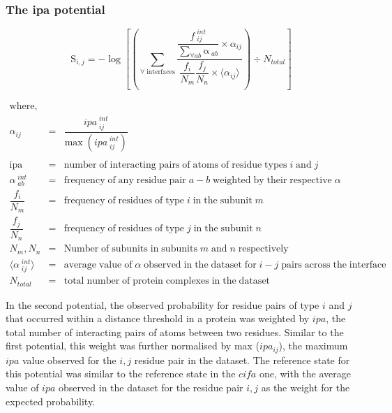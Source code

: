 \vspace{24pt}

\subsubsection{The ipa potential}

\vspace{24pt}

\begingroup
\large
\begin{equation}
\mathrm{S}_{i,j} = -\log \left[ \left( \sum\limits_{\forall \; \mathrm{interfaces}} \dfrac {\dfrac{ f_{\;ij}^{\;int}}{\sum\limits_{\forall ab} \mathrm{\alpha}_{\;ab}} \times \alpha_{ij}} {\dfrac{f_i}{N_m} \dfrac{f_j}{N_n} \times \langle \alpha_{ij} \rangle} \right) \div N_{total} \right]
\end{equation}
\endgroup

\begingroup
\setlength\abovedisplayskip{0pt}
\begin{eqnarray}
\mathrm{where,} \nonumber \\
\alpha_{ij} &=& \dfrac{{ipa}_{\;ij}^{\; int}}{\mathrm{max} \; ({ipa}_{\;ij}^{\;int})} \nonumber \\
\nonumber \\
\mathrm{ipa} &=&  \mathrm{number\; of \;interacting\; pairs\; of\; atoms \; of\;residue\; types\;} i \;\mathrm{and} \; j
\nonumber \\
\alpha_{\;ab}^{\;int} &=& \mathrm{frequency\;of\;any\;residue\;pair}\;a-b\; \mathrm{weighted\;by\;their\;respective\;}\alpha
\nonumber \\
\dfrac{f_i}{N_m} &=& \mathrm{frequency\;of\;residues\;of\;type\;}i \mathrm{\;in\;the\;subunit\;}m
\nonumber \\
\dfrac{f_j}{N_n} &=& \mathrm{frequency\;of\;residues\;of\;type\;}j \mathrm{\;in\;the\;subunit\;}n
\nonumber \\
N_m, N_n &=& \mathrm{Number\;of\;subunits\;in\;subunits\;} m\; \mathrm{and\;} n\; \mathrm{respectively}
\nonumber \\
\langle {\alpha}_{\;ij}^{\;int} \rangle &=& \mathrm{average\;value\;of}\; \alpha \;\mathrm{observed\;in\;the\;dataset\;for}\;i-j\; \mathrm{pairs\;across\;the\;interface}
\nonumber \\
N_{total} &=& \mathrm{total\;number\;of\;protein\;complexes\;in\;the\;dataset} \nonumber
\end{eqnarray}
\endgroup

In the second potential, the observed probability for residue pairs of type $i$ and $j$ that occurred within a distance threshold in a protein was weighted by $ipa$, the total number of interacting pairs of atoms between two residues. Similar to the first potential, this weight was further normalised by max ($ipa_{ij}$), the maximum $ipa$ value observed for the $i,j$ residue pair in the dataset. The reference state for this potential was similar to the reference state in the $cifa$ one, with the average value of $ipa$ observed in the dataset for the residue pair $i,j$ as the weight for the expected probability.

